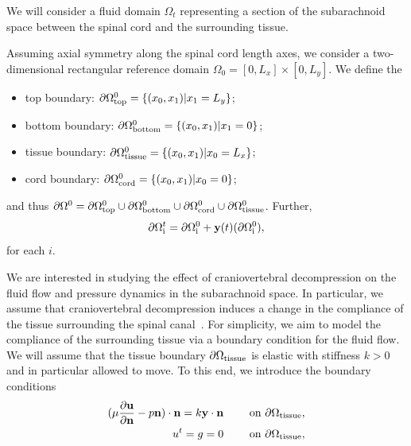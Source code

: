 \documentclass[11pt,a4paper,titlepage]{report}
\begin{document}
We will consider a fluid domain $\Omega_t$ representing a section of
the subarachnoid space between the spinal cord and the surrounding
tissue.

Assuming axial symmetry along the spinal cord length axes, we consider
a two-dimensional rectangular reference domain $\Omega_0 = [0, L_x]
\times [0, L_y]$. We define the
\begin{itemize}
\item
  top boundary: $\partial \Omega_{\rm top}^0 = \{ (x_0, x_1) | x_1 = L_y\}$;
\item
  bottom boundary: $\partial \Omega_{\rm bottom}^0 = \{ (x_0, x_1) | x_1 = 0\}$;
\item
  tissue boundary: $\partial \Omega_{\rm tissue}^0 = \{ (x_0, x_1) | x_0 = L_x\}$;
\item
  cord boundary: $\partial \Omega_{\rm cord}^0 = \{ (x_0, x_1) | x_0 = 0\}$;
\end{itemize}
and thus $\partial \Omega^0 = \partial \Omega_{\rm top}^0 \cup
\partial \Omega_{\rm bottom}^0 \cup \partial \Omega_{\rm cord}^0 \cup
\partial \Omega_{\rm tissue}^0$. Further,
\begin{equation}
  \partial \Omega^t_{\rm i} = \partial \Omega^0_{\rm i} + \mathbf{y}(t)(\partial \Omega^0_{\rm i}),
\end{equation}
for each $i$.

We are interested in studying the effect of craniovertebral
decompression on the fluid flow and pressure dynamics in the
subarachnoid space. In particular, we assume that craniovertebral
decompression induces a change in the compliance of the tissue
surrounding the spinal canal~\cite{}. For simplicity, we aim to model
the compliance of the surrounding tissue via a boundary condition for
the fluid flow. We will assume that the tissue boundary $\partial
\Omega_{\rm tissue}$ is elastic with stiffness $k > 0$ and in particular
allowed to move. To this end, we introduce the boundary conditions
\begin{align}
(\mu \frac{\partial \mathbf{u}}{\partial \mathbf{n}} - p \mathbf{n}) \cdot \mathbf{n} = k \mathbf{y} \cdot \mathbf{n} \qquad \text{ on } \partial \Omega_{\rm tissue},\\
u^t = g = 0 \qquad \text{ on } \partial \Omega_{\rm tissue},
\end{align}

\end{document}
